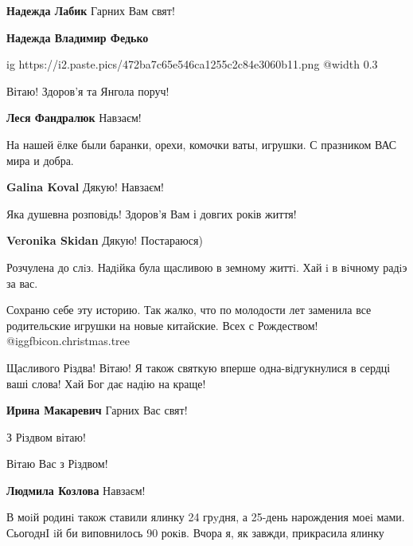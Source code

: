 \begin{itemize}
\begin{itemize} %
\textbf{Надежда Лабик} Гарних Вам свят!

\textbf{Надежда Владимир Федько}

\ifcmt
  ig https://i2.paste.pics/472ba7c65e546ca1255c2c84e3060b11.png
  @width 0.3
\fi

\end{itemize} %

Вітаю! Здоров'я та Янгола поруч!

\textbf{Леся Фандралюк} Навзаєм!

На нашей ёлке были баранки, орехи, комочки ваты, игрушки. С празником ВАС мира и добра.

\textbf{Galina Koval} Дякую! Навзаєм!


Яка душевна розповідь! Здоров'я Вам і довгих років життя!

\textbf{Veronika Skidan} Дякую! Постараюся)

Розчулена до слiз. Надiйка була щасливою в земному життi. Хай i в вiчному радiэ за вас.


Сохраню себе эту историю. Так жалко, что по молодости лет заменила все
родительские игрушки на новые китайские.  Всех с Рождеством!
@igg{fbicon.christmas.tree} 


Щасливого Різдва! Вітаю! Я також святкую вперше одна-відгукнулися в сердці ваші
слова! Хай Бог дає надію на краще!

\textbf{Ирина Макаревич} Гарних Вас свят!

З Різдвом вітаю!

Вітаю Вас з Різдвом!

\textbf{Людмила Козлова} Навзаєм!


В моiй родинi також ставили ялинку 24 грyдня, а 25-день нарождения моеi
мами. СьогоднI iй би виповнилось 90 рокiв. Вчора я, як завжди, прикрасила ялинку
\end{itemize} %
